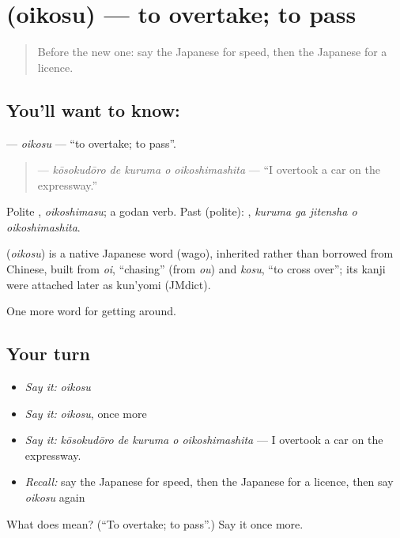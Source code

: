 \section[\texorpdfstring{\ja{おいこす} (oikosu)}{おいこす (oikosu)}]{ (oikosu) — to overtake; to pass}

\label{lesson:JA-C390-oikosu}



\begin{quote}
Before the new one: say the Japanese for speed, then the Japanese for a licence.
\end{quote}

\subsection*{You'll want to know: }
\textbf{} — \emph{oikosu} — \textquotedblleft{}to overtake; to pass\textquotedblright{}.

\begin{quote}
\textbf{  } — \emph{kōsokudōro de kuruma o oikoshimashita} — \textquotedblleft{}I overtook a car on the expressway.\textquotedblright{}
\end{quote}

Polite \textbf{}, \emph{oikoshimasu}; a godan verb. Past (polite): \textbf{  }, \emph{kuruma ga jitensha o oikoshimashita}.

\begin{cousinweb}
\textbf{} (\emph{oikosu}) is a native Japanese word (wago), inherited rather than borrowed from Chinese, built from \emph{oi}, \textquotedblleft{}chasing\textquotedblright{} (from \emph{ou}) and \emph{kosu}, \textquotedblleft{}to cross over\textquotedblright{}; its kanji were attached later as kun'yomi (JMdict).
\end{cousinweb}

\begin{grammarlens}[title={What you've built}]
One more word for getting around.
\end{grammarlens}

\subsection*{Your turn}
\begin{itemize}
\raggedright
  \item \emph{Say it:} \emph{oikosu}
  \item \emph{Say it:} \emph{oikosu}, once more
  \item \emph{Say it:} \emph{kōsokudōro de kuruma o oikoshimashita} — I overtook a car on the expressway.
  \item \emph{Recall:} say the Japanese for speed, then the Japanese for a licence, then say \emph{oikosu} again
\end{itemize}

\begin{tcolorbox}[breakable,colback=teal!4,colframe=teal!35!black,title={Before you move on}]
What does  mean? (\textquotedblleft{}To overtake; to pass\textquotedblright{}.) Say it once more.
\end{tcolorbox}

